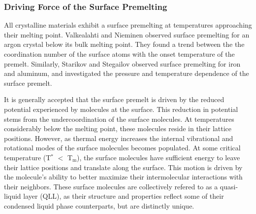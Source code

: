 \subsubsection{Driving Force of the Surface Premelting}
All crystalline materials exhibit a surface premelting at temperatures
approaching their melting point. Valkealahti and Nieminen observed
surface premelting for an argon crystal below its bulk melting
point.\cite{Valkealahti1987} They found a trend between the the
coordination number of the surface atoms with the onset temperature of
the premelt. Similarly, Starikov and Stegailov observed surface
premelting for iron and aluminum, and investigated the pressure and
temperature dependence of the surface premelt.\cite{Starikov2009}

It is generally accepted that the surface premelt is driven by the
reduced potential experienced by molecules at the surface. This
reduction in potential stems from the undercoordination of the surface
molecules.  At temperatures considerably below the melting point,
these molecules reside in their lattice positions. However, as thermal
energy increases the internal vibrational and rotational modes of the
surface molecules becomes populated. At some critical temperature
(T$^\mathrm{*}$ $<$ T$_\mathrm{m}$), the surface molecules have
sufficient energy to leave their lattice positions and translate along
the surface. This motion is driven by the molecule's ability
to better maximize their intermolecular interactions with their
neighbors. These surface molecules are collectively refered to as a
quasi-liquid layer (QLL), as their structure and properties reflect
some of their condensed liquid phase counterparts, but are distinctly
unique.

